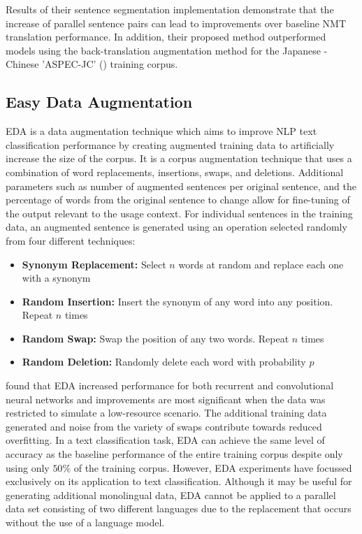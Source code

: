 Results of their sentence segmentation implementation demonstrate that the increase of parallel sentence pairs can lead to improvements over baseline \acrshort{NMT} translation performance. In addition, their proposed method outperformed models using the back-translation augmentation method for the Japanese - Chinese 'ASPEC-JC' (\cite{NAKAZAWA16.621}) training corpus.

\subsection{Easy Data Augmentation}
\acrfull{EDA} is a data augmentation technique which aims to improve \acrshort{NLP} text classification performance by creating augmented training data to artificially increase the size of the corpus. It is a corpus augmentation technique that uses a combination of word replacements, insertions, swaps, and deletions. Additional parameters such as number of augmented sentences per original sentence, and the percentage of words from the original sentence to change allow for fine-tuning of the output relevant to the usage context. For individual sentences in the training data, an augmented sentence is generated using an operation selected randomly from four different techniques:
\begin{itemize}
    \item \textbf{Synonym Replacement:} Select $n$ words at random and replace each one with a synonym
    \item \textbf{Random Insertion:} Insert the synonym of any word into any position. Repeat $n$ times
    \item \textbf{Random Swap:} Swap the position of any two words. Repeat $n$ times
    \item \textbf{Random Deletion:} Randomly delete each word with probability $p$
\end{itemize}

\cite{wei_eda:_2019} found that \acrshort{EDA} increased performance for both recurrent and convolutional neural networks and improvements are most significant when the data was restricted to simulate a low-resource scenario. The additional training data generated and noise from the variety of swaps contribute towards reduced overfitting. In a text classification task, \acrshort{EDA} can achieve the same level of accuracy as the baseline performance of the entire training corpus despite only using only $50$\% of the training corpus. However, \acrshort{EDA} experiments have focussed exclusively on its application to text classification. Although it may be useful for generating additional monolingual data, \acrshort{EDA} cannot be applied to a parallel data set consisting of two different languages due to the replacement that occurs without the use of a language model.

